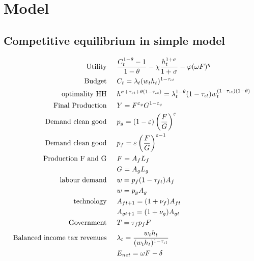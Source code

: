 \clearpage
\appendix
\section{Model}\label{app:model}

\subsection{Competitive equilibrium in simple model}

\begin{align}
\text{Utility}\hspace{5mm}& \frac{C_t^{1-\theta}-1}{1-\theta}-\chi \frac{h_t^{1+\sigma}}{1+\sigma}-\varphi(\omega F)^\eta\\
\text{Budget}\hspace{5mm}& C_t = \lambda_t(w_th_t)^{1-\tau_{\iota t}}\\
\text{optimality HH}\hspace{5mm}& h^{\sigma+\tau_{\iota t}+\theta(1-\tau_{\iota t})}=\lambda_t^{1-\theta}(1-\tau_{\iota t})w_t^{(1-\tau_{\iota t})(1-\theta)}\\
\text{Final Production}\hspace{5mm}&Y=F^{\varepsilon_y}G^{1-
	\varepsilon_y}\\ %
\text{Demand clean good}\hspace{5mm}&p_g=(1-\varepsilon)\left(\frac{F}{G}\right)^\varepsilon\label{eq:ana_dem_clean}\\
\text{Demand clean good}\hspace{5mm}&p_f=\varepsilon\left(\frac{F}{G}\right)^{\varepsilon-1}\label{eq:ana_dem_dirty}\\
\text{Production F and G}\hspace{5mm}&F=A_fL_f\label{eq:ana_prod_F}\\\
& G=A_gL_g\label{eq:ana_prod_G}\\
\text{labour demand}\hspace{5mm}& w=p_f(1-\tau_{ft})A_f\\
& w=p_gA_g\\
\text{technology}\hspace{5mm}&A_{ft+1}=(1+\nu_f)A_{ft}\\
&A_{gt+1}=(1+\nu_g)A_{gt}\\
\text{Government}\hspace{5mm}&T=\tau_{f}p_fF
\\
\text{Balanced income tax revenues}\hspace{5mm}&\lambda_t=\frac{w_t h_t}{(w_t h_t)^{1-\tau_{\iota t}}}\\
&E_{net}=\omega F-\delta
\end{align}


